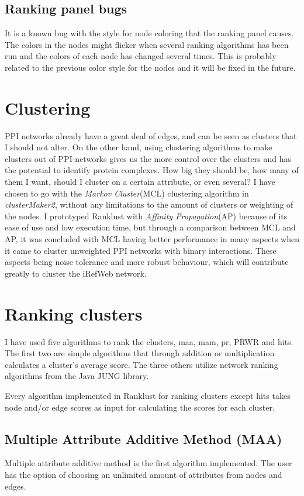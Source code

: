 \subsection{Ranking panel bugs}
It is a known bug with the style for node coloring that the ranking panel
causes. The colors in the nodes might flicker when several ranking algorithms
has been run and the colors of each node has changed several times. This is
probably related to the previous color style for the nodes and it will be fixed
in the future.

\section{Clustering}
PPI networks already have a great deal of edges, and can be seen as clusters
that I should not alter. On the other hand, using clustering algorithms to make
clusters out of PPI-networks gives us the more control over the clusters and has
the potential to identify protein complexes\cite{ap-vs-mcl}. How big they should
be, how many of them I want, should I cluster on a certain attribute, or even
several? I have chosen to go with the \textit{Markov Cluster}(MCL)\cite{mcl}
clustering algorithm in \textit{clusterMaker2}, without any limitations to the
amount of clusters or weighting of the nodes. I prototyped Ranklust with
\textit{Affinity Propagation}(AP)\cite{affinity-propagation} because of its ease
of use and low execution time, but through a comparison between MCL and AP, it
was concluded with MCL having better performance in many aspects when it came to
cluster unweighted PPI networks\cite{ap-vs-mcl} with binary interactions. These
aspects being noise tolerance and more robust behaviour, which will contribute
greatly to cluster the iRefWeb network.

\section{Ranking clusters}
I have used five algorithms to rank the clusters, \gls{maa}, \gls{mam},
\gls{pr}, PRWR and \gls{hits}. The first two are simple algorithms that through
addition or multiplication calculates a cluster's average score. The three
others utilize network ranking algorithms from the Java JUNG\cite{jung} library.

Every algorithm implemented in Ranklust for ranking clusters except \gls{hits}
takes node and/or edge scores as input for calculating the scores for each
cluster.

\subsection{Multiple Attribute Additive Method (MAA)}
Multiple attribute additive method is the first algorithm implemented.  The user
has the option of choosing an unlimited amount of attributes from nodes and
edges.

